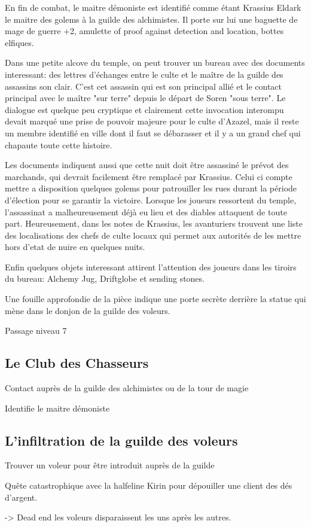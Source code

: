 En fin de combat, le maitre démoniste est identifié comme étant Krassius Eldark
le maitre des golems à la guilde des alchimistes. Il porte sur lui une baguette
de mage de guerre +2, amulette of proof against detection and location, bottes
elfiques.

Dans une petite alcove du temple, on peut trouver un bureau avec des documents 
interessant: des lettres d'échanges entre le culte et le maître de la guilde
des assassins
son clair. C'est cet assassin qui est son principal allié 
et le contact principal avec le maître "sur terre" depuis le départ de Soren  
"sous terre". Le dialogue est quelque peu cryptique et clairement cette invocation
interompu devait marqué une prise de pouvoir majeure pour le culte d'Azazel, mais
il reste un membre identifié en ville dont il faut se débarasser et il y a
un grand chef qui chapaute toute cette histoire. 

Les documents indiquent aussi que cette nuit doit être assassiné le prévot des 
marchands, qui devrait facilement être remplacé par Krassius. Celui ci compte
mettre a disposition quelques golems pour patrouiller les rues durant la période
d'élection pour se garantir la victoire. Lorsque les joueurs ressortent du temple,
l'assassinat a malheureusement déjà eu lieu et des diables attaquent de toute 
part. Heureusement, dans les notes de Krassius, les avanturiers trouvent une liste
des localisations des chefs de culte locaux qui permet aux autorités de les mettre
hors d'etat de nuire en quelques nuits.

Enfin quelques objets interessant attirent l'attention des joueurs dans les tiroirs
du bureau: Alchemy Jug, Driftglobe et sending stones.

Une fouille approfondie de la pièce indique une porte secrète derrière la statue qui 
mène dans le donjon de la guilde des voleurs.

Passage niveau 7

\subsection*{Le Club des Chasseurs}

Contact auprès de la guilde des alchimistes ou de la tour de magie


Identifie le maitre démoniste

\subsection*{L'infiltration de la guilde des voleurs}

Trouver un voleur pour être introduit auprès de la guilde

Quête catastrophique avec la halfeline Kirin pour dépouiller une client des dés d'argent.

-> Dead end les voleurs disparaissent les uns après les autres.


